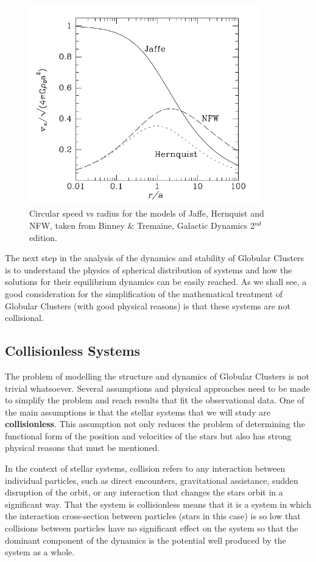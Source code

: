 \begin{figure}[H]
\centering
\includegraphics[width=10cm]{images/circular_velocity_vs_radius.png}
\caption[Circular speed vs radius for the Jaffe, Hernquist, and NFW models]{Circular speed vs radius for the models of Jaffe, Hernquist and NFW, taken from Binney \& Tremaine, Galactic Dynamics 2$^{nd}$ edition.}
\end{figure}

The next step in the analysis of the dynamics and stability of Globular Clusters is to understand the physics of spherical distribution of systems and how the solutions for their equilibrium dynamics can be easily reached. As we shall see, a good consideration for the simplification of the mathematical treatment of Globular Clusters (with good physical reasons) is that these systems are not collisional.

\subsection{Collisionless Systems}

The problem of modelling the structure and dynamics of Globular Clusters is not trivial whatsoever. Several assumptions and physical approaches need to be made to simplify the problem and reach results that fit the observational data. One of the main assumptions is that the stellar systems that we will study are \textbf{collisionless}. This assumption not only reduces the problem of determining the functional form of the position and velocities of the stars but also has strong physical reasons that must be mentioned.

In the context of stellar systems, collision refers to any interaction between individual particles, such as direct encounters, gravitational assistance, sudden disruption of the orbit, or any interaction that changes the stars orbit in a significant way. That the system is collisionless means that it is a system in which the interaction cross-section between particles (stars in this case) is so low that collisions between particles have no significant effect on the system so that the dominant component of the dynamics is the potential well produced by the system as a whole.  


